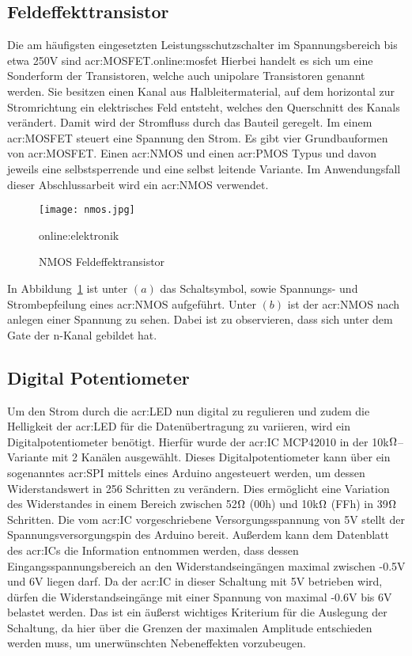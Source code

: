 \newpage
\subsection{Feldeffekttransistor}
\label{subsec:mosfet}
Die am häufigsten eingesetzten Leistungsschutzschalter im Spannungsbereich bis etwa 250V sind \gls{acr:MOSFET}.\gls{online:mosfet} Hierbei handelt es sich um eine Sonderform der Transistoren, welche auch unipolare Transistoren genannt werden. Sie besitzen einen Kanal aus Halbleitermaterial, auf dem horizontal zur Stromrichtung ein elektrisches Feld entsteht, welches den Querschnitt des Kanals verändert. Damit wird der Stromfluss durch das Bauteil geregelt. Im einem \gls{acr:MOSFET} steuert eine Spannung den Strom. Es gibt vier Grundbauformen von \gls{acr:MOSFET}. Einen \gls{acr:NMOS} und einen \gls{acr:PMOS} Typus und davon jeweils eine selbstsperrende und eine selbst leitende Variante. Im Anwendungsfall dieser Abschlussarbeit wird ein \gls{acr:NMOS} verwendet.\cite{heringElektrotechnikUndElektronik2018} 
\newline
\newline

\begin{figure}[H]
	\centering
	\texttt{[image: nmos.jpg]}
	\caption[NMOS Feldeffektransistor]{NMOS Feldeffektransistor} 
	\gls{online:elektronik}
	\label{fig:nmos}
\end{figure}


In Abbildung~\ref{fig:nmos} ist unter $(a)$ das Schaltsymbol, sowie Spannungs- und Strombepfeilung eines \gls{acr:NMOS} aufgeführt. Unter $(b)$ ist der \gls{acr:NMOS} nach anlegen einer Spannung zu sehen. Dabei ist zu observieren, dass sich unter dem Gate der n-Kanal gebildet hat. 
\newpage
\subsection{Digital Potentiometer}
\label{subsec:digipot}

Um den Strom durch die \gls{acr:LED} nun digital zu regulieren und zudem die Helligkeit der \gls{acr:LED} für die Datenübertragung zu variieren, wird ein Digitalpotentiometer benötigt. Hierfür wurde der \gls{acr:IC} MCP42010 in der 10k$\ohm$–Variante mit 2 Kanälen ausgewählt. Dieses Digitalpotentiometer kann über ein sogenanntes \gls{acr:SPI} mittels eines Arduino angesteuert werden, um dessen Widerstandswert in 256 Schritten zu verändern. Dies ermöglicht eine Variation des Widerstandes in einem Bereich zwischen 52$\ohm$ (00h) und 10k$\ohm$ (FFh) in 39$\ohm$ Schritten. 
Die vom \gls{acr:IC} vorgeschriebene Versorgungsspannung von 5V stellt der Spannungsversorgungspin des Arduino bereit. Außerdem kann dem Datenblatt des \gls{acr:IC}s die Information entnommen werden, dass dessen Eingangsspannungsbereich an den Widerstandseingängen maximal zwischen -0.5V und 6V liegen darf. Da der \gls{acr:IC} in dieser Schaltung mit 5V betrieben wird, dürfen die Widerstandseingänge mit einer Spannung von maximal -0.6V bis 6V belastet werden. Das ist ein äußerst wichtiges Kriterium für die Auslegung der Schaltung, da hier über die Grenzen der maximalen Amplitude entschieden werden muss, um unerwünschten Nebeneffekten vorzubeugen.

